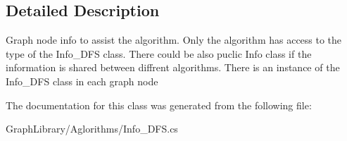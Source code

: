 \subsection{Detailed Description}
Graph node info to assist the algorithm. Only the algorithm has access to the type of the Info\+\_\+\+D\+F\+S class. There could be also puclic Info class if the information is shared between diffrent algorithms. There is an instance of the Info\+\_\+\+D\+F\+S class in each graph node 



The documentation for this class was generated from the following file\+:\begin{DoxyCompactItemize}
\item 
Graph\+Library/\+Aglorithms/Info\+\_\+\+D\+F\+S.\+cs\end{DoxyCompactItemize}

